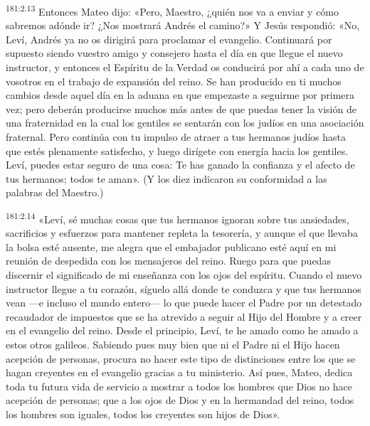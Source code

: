 \par 
\textsuperscript{181:2.13} Entonces Mateo dijo: «Pero, Maestro, ¿quién nos va a enviar y cómo sabremos adónde ir? ¿Nos mostrará Andrés el camino?» Y Jesús respondió: «No, Leví, Andrés ya no os dirigirá para proclamar el evangelio. Continuará por supuesto siendo vuestro amigo y consejero hasta el día en que llegue el nuevo instructor, y entonces el Espíritu de la Verdad os conducirá por ahí a cada uno de vosotros en el trabajo de expansión del reino. Se han producido en ti muchos cambios desde aquel día en la aduana en que empezaste a seguirme por primera vez; pero deberán producirse muchos más antes de que puedas tener la visión de una fraternidad en la cual los gentiles se sentarán con los judíos en una asociación fraternal. Pero continúa con tu impulso de atraer a tus hermanos judíos hasta que estés plenamente satisfecho, y luego dirígete con energía hacia los gentiles. Leví, puedes estar seguro de una cosa: Te has ganado la confianza y el afecto de tus hermanos; todos te aman». (Y los diez indicaron su conformidad a las palabras del Maestro.)

\par 
\textsuperscript{181:2.14} «Leví, sé muchas cosas que tus hermanos ignoran sobre tus ansiedades, sacrificios y esfuerzos para mantener repleta la tesorería, y aunque el que llevaba la bolsa esté ausente, me alegra que el embajador publicano esté aquí en mi reunión de despedida con los mensajeros del reino. Ruego para que puedas discernir el significado de mi enseñanza con los ojos del espíritu. Cuando el nuevo instructor llegue a tu corazón, síguelo allá donde te conduzca y que tus hermanos vean ---e incluso el mundo entero--- lo que puede hacer el Padre por un detestado recaudador de impuestos que se ha atrevido a seguir al Hijo del Hombre y a creer en el evangelio del reino. Desde el principio, Leví, te he amado como he amado a estos otros galileos. Sabiendo pues muy bien que ni el Padre ni el Hijo hacen acepción de personas, procura no hacer este tipo de distinciones entre los que se hagan creyentes en el evangelio gracias a tu ministerio. Así pues, Mateo, dedica toda tu futura vida de servicio a mostrar a todos los hombres que Dios no hace acepción de personas; que a los ojos de Dios y en la hermandad del reino, todos los hombres son iguales, todos los creyentes son hijos de Dios».

